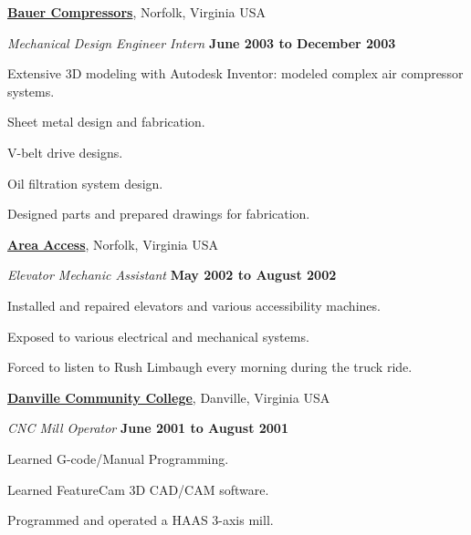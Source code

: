 \documentclass[10pt]{article}
\newenvironment{outerlist}[1][\enskip\textbullet]%
        {\begin{itemize}[#1]}{\end{itemize}%
         \vspace{-.6\baselineskip}}
\newenvironment{innerlist}[1][\enskip\textbullet]%
        {\begin{compactitem}[#1]}{\end{compactitem}}
\newcommand{\blankline}{\quad\pagebreak[2]}
\begin{document}
\begin{innerlist}
\blankline

\href{http://www.bauercomp.com/}{\textbf{Bauer Compressors}}, Norfolk, Virginia
USA
\begin{outerlist}
  \item[] \textit{Mechanical Design Engineer Intern}%
    \hfill \textbf{June 2003 to December 2003}
  \begin{innerlist}
    \item Extensive 3D modeling with Autodesk Inventor: modeled complex
        air compressor systems.
    \item Sheet metal design and fabrication.
    \item V-belt drive designs.
    \item Oil filtration system design.
    \item Designed parts and prepared drawings for fabrication.
  \end{innerlist}
\end{outerlist}

\blankline

\href{http://www.areaaccess.com/}{\textbf{Area Access}}, Norfolk, Virginia USA
\begin{outerlist}
  \item[] \textit{Elevator Mechanic Assistant}%
    \hfill \textbf{May 2002 to August 2002}
  \begin{innerlist}
    \item Installed and repaired elevators and various accessibility machines.
    \item Exposed to various electrical and mechanical systems.
    \item Forced to listen to Rush Limbaugh every morning during the truck
      ride.
  \end{innerlist}
\end{outerlist}

\blankline

\href{http://www.dcc.vccs.edu/}{\textbf{Danville Community College}}, Danville, Virginia USA
\begin{outerlist}
  \item[] \textit{CNC Mill Operator}%
    \hfill \textbf{June 2001 to August 2001}
  \begin{innerlist}
    \item Learned G-code/Manual Programming.
    \item Learned FeatureCam 3D CAD/CAM software.
    \item Programmed and operated a HAAS 3-axis mill.
  \end{innerlist}
\end{outerlist}


\end{innerlist}
\end{document}
